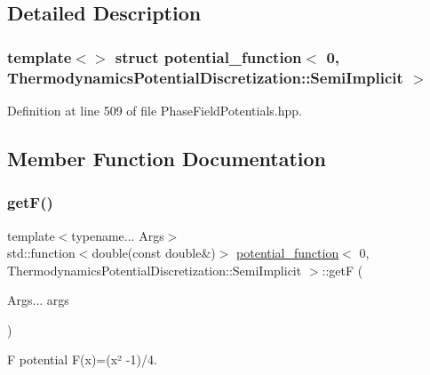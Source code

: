 \subsection{Detailed Description}
\subsubsection*{template$<$$>$\newline
struct potential\+\_\+function$<$ 0, Thermodynamics\+Potential\+Discretization\+::\+Semi\+Implicit $>$}



Definition at line 509 of file Phase\+Field\+Potentials.\+hpp.



\subsection{Member Function Documentation}
\mbox{\label{structpotential__function_3_010_00_01ThermodynamicsPotentialDiscretization_1_1SemiImplicit_01_4_a9bb69d00c5351b45d864fb056650cd1f}} 
\subsubsection{\texorpdfstring{get\+F()}{getF()}}
{\footnotesize\ttfamily template$<$typename... Args$>$ \\
std\+::function$<$double(const double\&)$>$ \hyperlink{structpotential__function}{potential\+\_\+function}$<$ 0, Thermodynamics\+Potential\+Discretization\+::\+Semi\+Implicit $>$\+::getF (\begin{DoxyParamCaption}\item[{Args...}]{args }\end{DoxyParamCaption})\hspace{0.3cm}{\ttfamily [inline]}}



F potential F(x)=(x² -\/1)/4. 


